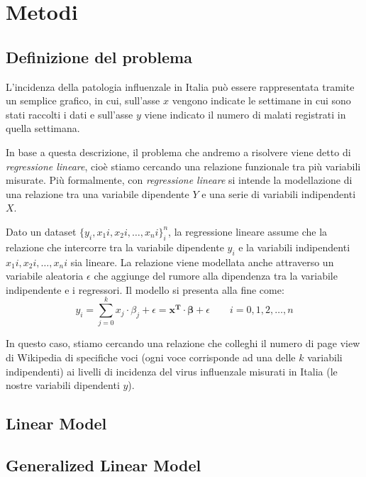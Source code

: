 \chapter{Metodi}

\section{Definizione del problema}

L'incidenza della patologia influenzale in Italia può essere rappresentata tramite un semplice grafico, in cui, sull'asse $x$ 
vengono indicate le settimane in cui sono stati raccolti i dati e sull'asse $y$ viene indicato il numero di malati registrati
in quella settimana.


In base a questa descrizione, il problema che andremo a risolvere viene detto di \textit{regressione lineare}, cioè stiamo 
cercando una relazione funzionale tra più variabili misurate. Più formalmente, con \textit{regressione lineare} si intende
la modellazione di una relazione tra una variabile dipendente $Y$ e una serie di variabili indipendenti $X$. 
\bigskip

Dato un dataset $\{ y_i, x_1i, x_2i,\ldots, x_ni\}^n_i$, la regressione lineare assume che la relazione che intercorre tra la 
variabile dipendente $y_i$ e la variabili indipendenti ${x_1i, x_2i,\ldots, x_ni}$ sia lineare. La relazione viene modellata
anche attraverso un variabile aleatoria $\epsilon$ che aggiunge del rumore alla dipendenza tra la variabile indipendente e i 
regressori. Il modello si presenta alla fine come:
\begin{equation}
y_i = \sum_{j=0}^k x_j \cdot \beta_j + \epsilon = \bm{x^{T}\cdot\beta}+\epsilon \qquad i=0,1,2,\ldots ,n
\end{equation}

In questo caso, stiamo cercando una relazione che colleghi il numero di page 
view di Wikipedia di specifiche voci (ogni voce corrisponde ad una delle $k$ variabili indipendenti) ai livelli di incidenza 
del virus influenzale misurati in Italia (le nostre variabili dipendenti $y$).  

\section{Linear Model}

\section{Generalized Linear Model}

\newpage